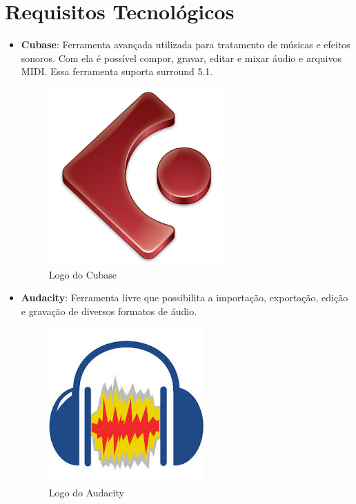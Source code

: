 \documentclass[11pt]{article} %
\begin{document}
\section{Requisitos Tecnológicos}

\begin{itemize}

\item \textbf{Cubase}: Ferramenta avançada utilizada para tratamento de músicas e efeitos sonoros. Com ela é possível compor, gravar, editar e mixar áudio e arquivos MIDI. Essa ferramenta suporta surround 5.1.

\newpage

\begin{figure}[!htp]
\centering
\includegraphics[scale=0.3]{pictures/cubase-Logo.png}
\caption{Logo do Cubase}
\label{Cubase}
\end{figure}

\item \textbf{Audacity}: Ferramenta livre que possibilita a importação, exportação, edição e gravação de diversos formatos de áudio.

\begin{figure}[!htp]
\centering
\includegraphics[scale=0.3]{pictures/audacity.jpg}
\caption{Logo do Audacity}
\label{Audacity}
\end{figure}


\end{itemize}
\end{document}
